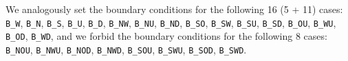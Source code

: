 \documentclass[a4paper, 12pt]{article}
\begin{document}
%
We analogously set the boundary conditions for the following 16 (5 + 11) cases: \texttt{B\_W}, \texttt{B\_N}, \texttt{B\_S}, \texttt{B\_U}, \texttt{B\_D}, \texttt{B\_NW}, \texttt{B\_NU}, \texttt{B\_ND}, \texttt{B\_SO}, \texttt{B\_SW}, \texttt{B\_SU}, \texttt{B\_SD}, \texttt{B\_OU}, \texttt{B\_WU}, \texttt{B\_OD}, \texttt{B\_WD},
and we forbid the boundary conditions for the following 8 cases: \texttt{B\_NOU}, \texttt{B\_NWU}, \texttt{B\_NOD}, \texttt{B\_NWD}, \texttt{B\_SOU}, \texttt{B\_SWU}, \texttt{B\_SOD}, \texttt{B\_SWD}.
\end{document}
